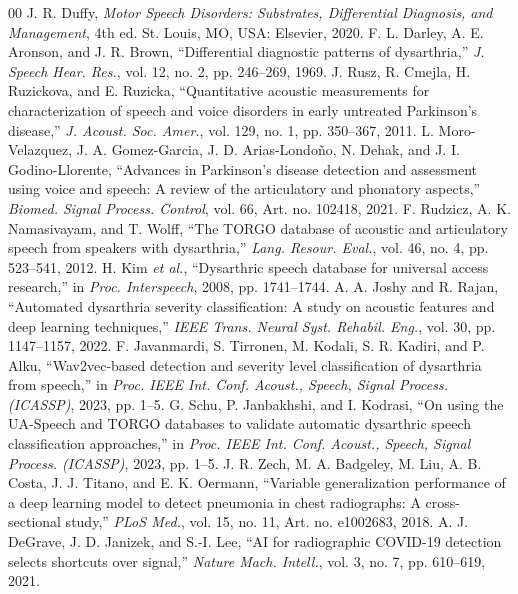 \documentclass[conference]{IEEEtran}
\begin{document}
\begin{thebibliography}{00}
 J. R. Duffy, \emph{Motor Speech Disorders: Substrates, Differential Diagnosis, and Management}, 4th ed. St. Louis, MO, USA: Elsevier, 2020.
 F. L. Darley, A. E. Aronson, and J. R. Brown, ``Differential diagnostic patterns of dysarthria,'' \emph{J. Speech Hear. Res.}, vol. 12, no. 2, pp. 246--269, 1969.
 J. Rusz, R. Cmejla, H. Ruzickova, and E. Ruzicka, ``Quantitative acoustic measurements for characterization of speech and voice disorders in early untreated Parkinson's disease,'' \emph{J. Acoust. Soc. Amer.}, vol. 129, no. 1, pp. 350--367, 2011.
 L. Moro-Velazquez, J. A. Gomez-Garcia, J. D. Arias-Londo\~no, N. Dehak, and J. I. Godino-Llorente, ``Advances in Parkinson's disease detection and assessment using voice and speech: A review of the articulatory and phonatory aspects,'' \emph{Biomed. Signal Process. Control}, vol. 66, Art. no. 102418, 2021.
 F. Rudzicz, A. K. Namasivayam, and T. Wolff, ``The TORGO database of acoustic and articulatory speech from speakers with dysarthria,'' \emph{Lang. Resour. Eval.}, vol. 46, no. 4, pp. 523--541, 2012.
 H. Kim \emph{et al.}, ``Dysarthric speech database for universal access research,'' in \emph{Proc. Interspeech}, 2008, pp. 1741--1744.
 A. A. Joshy and R. Rajan, ``Automated dysarthria severity classification: A study on acoustic features and deep learning techniques,'' \emph{IEEE Trans. Neural Syst. Rehabil. Eng.}, vol. 30, pp. 1147--1157, 2022.
 F. Javanmardi, S. Tirronen, M. Kodali, S. R. Kadiri, and P. Alku, ``Wav2vec-based detection and severity level classification of dysarthria from speech,'' in \emph{Proc. IEEE Int. Conf. Acoust., Speech, Signal Process. (ICASSP)}, 2023, pp. 1--5.
 G. Schu, P. Janbakhshi, and I. Kodrasi, ``On using the UA-Speech and TORGO databases to validate automatic dysarthric speech classification approaches,'' in \emph{Proc. IEEE Int. Conf. Acoust., Speech, Signal Process. (ICASSP)}, 2023, pp. 1--5.
 J. R. Zech, M. A. Badgeley, M. Liu, A. B. Costa, J. J. Titano, and E. K. Oermann, ``Variable generalization performance of a deep learning model to detect pneumonia in chest radiographs: A cross-sectional study,'' \emph{PLoS Med.}, vol. 15, no. 11, Art. no. e1002683, 2018.
 A. J. DeGrave, J. D. Janizek, and S.-I. Lee, ``AI for radiographic COVID-19 detection selects shortcuts over signal,'' \emph{Nature Mach. Intell.}, vol. 3, no. 7, pp. 610--619, 2021.

\end{thebibliography}
\end{document}
